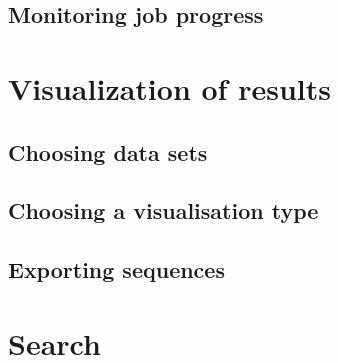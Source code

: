 \subsection{Monitoring job progress}
\section{Visualization of results}
\subsection{Choosing data sets}
\subsection{Choosing a visualisation type}
\subsection{Exporting sequences}
\section{Search}


